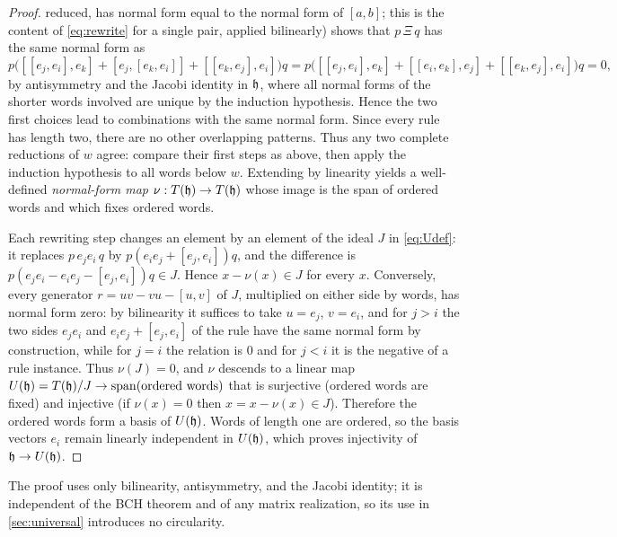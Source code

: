 \begin{proof}
reduced, has normal form equal to the normal form of $[a,b]$; this is the
content of \eqref{eq:rewrite} for a single pair, applied bilinearly)
shows that $p\,\Xi\,q$ has the same normal form as
\[
 p\bigl([[e_j,e_i],e_k]+[e_j,[e_k,e_i]]+[[e_k,e_j],e_i]\bigr)q
 =p\bigl([[e_j,e_i],e_k]+[[e_i,e_k],e_j]+[[e_k,e_j],e_i]\bigr)q=0,
\]
by antisymmetry and the Jacobi identity in $\mathfrak{h}$, where all normal forms of
the shorter words involved are unique by the induction hypothesis. Hence
the two first choices lead to combinations with the same normal form.
Since every rule has length two, there are no other overlapping patterns.
Thus any two complete reductions of $w$ agree: compare their first steps
as above, then apply the induction hypothesis to all words below $w$.
Extending by linearity yields a well-defined \emph{normal-form map}
$\nu:T(\mathfrak{h})\to T(\mathfrak{h})$ whose image is the span of ordered words and which
fixes ordered words.

Each rewriting step changes an element by an element of the ideal
$J$ in \eqref{eq:Udef}: it replaces $p\,e_je_i\,q$ by
$p(e_ie_j+[e_j,e_i])q$, and the difference is $p(e_je_i-e_ie_j-[e_j,e_i])q\in J$.
Hence $x-\nu(x)\in J$ for every $x$. Conversely, every generator
$r=uv-vu-[u,v]$ of $J$, multiplied on either side by words, has normal form
zero: by bilinearity it suffices to take $u=e_j$, $v=e_i$, and for $j>i$
the two sides $e_je_i$ and $e_ie_j+[e_j,e_i]$ of the rule have the same
normal form by construction, while for $j=i$ the relation is $0$ and for
$j<i$ it is the negative of a rule instance. Thus $\nu(J)=0$, and
$\nu$ descends to a linear map $U(\mathfrak{h})=T(\mathfrak{h})/J\to\mathrm{span}(\text{ordered words})$
that is surjective (ordered words are fixed) and injective (if $\nu(x)=0$
then $x=x-\nu(x)\in J$). Therefore the ordered words form a basis of
$U(\mathfrak{h})$. Words of length one are ordered, so the basis vectors $e_i$ remain
linearly independent in $U(\mathfrak{h})$, which proves injectivity of $\mathfrak{h}\to U(\mathfrak{h})$.
\end{proof}
The proof uses only bilinearity, antisymmetry, and the Jacobi identity; it
is independent of the BCH theorem and of any matrix realization, so its use
in \cref{sec:universal} introduces no circularity.

